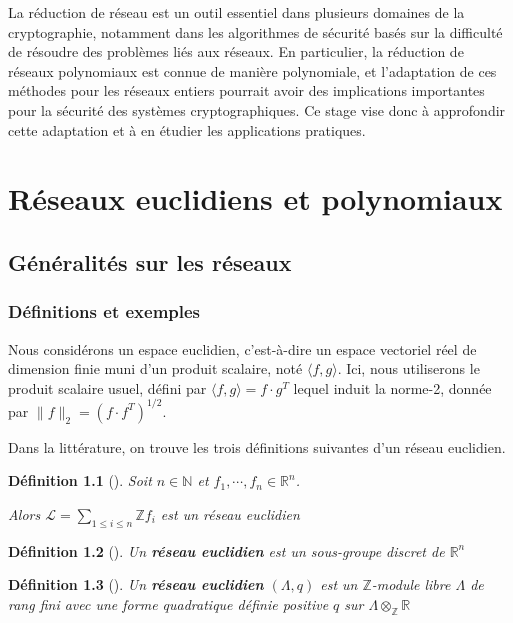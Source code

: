 \documentclass[a4paper,12pt]{report}  %
\theoremstyle{definitionstyle}
\newtheorem{definition}{Définition}[chapter] %
\theoremstyle{examplestyle}
\theoremstyle{remarkstyle}
\theoremstyle{propositionstyle}
\theoremstyle{theoremstyle}
\begin{document}
	La réduction de réseau est un outil essentiel dans plusieurs domaines de la cryptographie, notamment dans les algorithmes de sécurité basés sur la difficulté de résoudre des problèmes liés aux réseaux. En particulier, la réduction de réseaux polynomiaux est connue de manière polynomiale, et l'adaptation de ces méthodes pour les réseaux entiers pourrait avoir des implications importantes pour la sécurité des systèmes cryptographiques. Ce stage vise donc à approfondir cette adaptation et à en étudier les applications pratiques.	
	
	\chapter{Réseaux euclidiens et polynomiaux}
	

	
	\section{Généralités sur les réseaux}
	
	
	\subsection{Définitions et exemples}
	Nous considérons un espace euclidien, c'est-à-dire un espace vectoriel réel de dimension finie muni d'un produit scalaire, noté $\langle f, g \rangle$. Ici, nous utiliserons le produit scalaire usuel, défini par $\langle f, g \rangle = f \cdot g^T$ lequel induit la norme-2, donnée par $\|f\|_2=(f \cdot f^T)^{1/2}$.
	
	
	Dans la littérature, on trouve les trois définitions suivantes d’un réseau euclidien.
	\begin{definition}[\cite{MCA}]
		Soit $n \in \mathbb{N}$ et $f_1, \cdots, f_n \in \mathbb{R}^n$.
		
		Alors $\mathcal{L} = \sum_{1 \leq i \leq n} \mathbb{Z} f_i
		$ est un réseau euclidien
	\end{definition}

	\begin{definition}[\cite{Wallet}]
		Un \textbf{réseau euclidien} est un sous-groupe discret de $\mathbb{R}^n$
	\end{definition}


	\begin{definition}[\cite{clef_unique_2}]
		Un \textbf{réseau euclidien} $(\Lambda, q)$ est un $\mathbb{Z}$-module libre $\Lambda$ de rang fini avec une forme quadratique définie positive $q$ sur $\Lambda \otimes_\mathbb{Z} \mathbb{R}$ 
	\end{definition}
	
\end{document}
